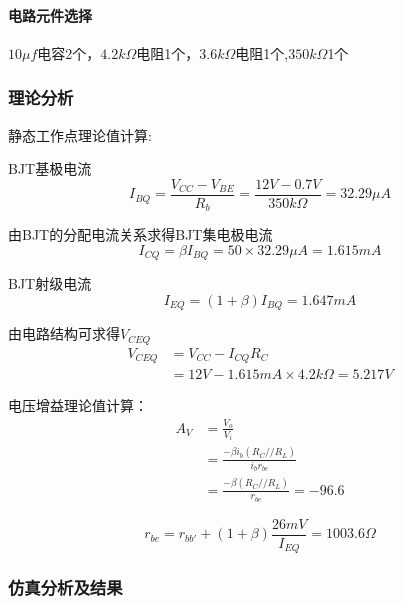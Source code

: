 \documentclass[10pt, conference, compsocconf, a4paper]{IEEEtran}
\begin{document}
\paragraph{电路元件选择}\noindent

$10\mu f$电容2个，$4.2k\Omega$电阻1个，$3.6k\Omega$电阻1个,$350k\Omega$1个
\subsubsection{理论分析} %
静态工作点理论值计算:\cite{elecTextBook}

BJT基极电流
\begin{equation}
  I_{BQ}=\frac{V_{CC}-V_{BE}}{R_b}=\frac{12V-0.7V}{350k\Omega}=32.29\mu A
\end{equation}

由BJT的分配电流关系求得BJT集电极电流
\begin{equation}
  I_{CQ}=\beta I_{BQ}=50\times32.29\mu A=1.615mA
\end{equation}

BJT射级电流
\begin{equation}
  I_{EQ}=(1+\beta)I_{BQ}=1.647mA
\end{equation}

由电路结构可求得$V_{CEQ}$
\begin{equation}
  \begin{split}
    V_{CEQ}&=V_{CC}-I_{CQ}R_C\\
    &=12V-1.615mA\times 4.2k\Omega=5.217V
  \end{split}
\end{equation}

电压增益理论值计算：
\begin{equation}
  \begin{split}
    A_V&=\frac{V_o}{V_i}\\
    &=\frac{-\beta i_b(R_C//R_L)}{i_br_{be}}\\
    &=\frac{-\beta(R_C//R_L)}{r_{be}}=-96.6
  \end{split}
\end{equation}

\begin{equation}
  r_{be}=r_{bb'}+(1+\beta)\frac{26mV}{I_{EQ}}=1003.6\Omega
\end{equation}

\subsubsection{仿真分析及结果}
\end{document}
